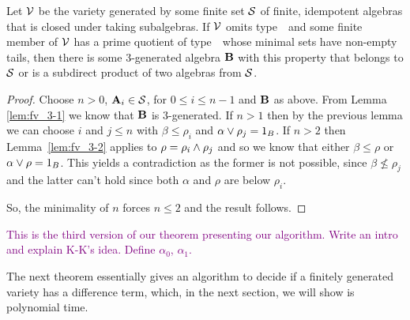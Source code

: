 

\begin{theorem}\label{thm:fv_3-4}
Let $\mathcal{V}$ be the variety generated by some finite set $\mathcal{S}$ of finite,
idempotent algebras that is closed under taking subalgebras. If\/ $\mathcal{V}$
omits type~\utyp\ and some finite member of $\mathcal{V}$ has a prime quotient 
of type~\atyp\
whose minimal sets have non-empty tails, then there is some
3-generated algebra $\mathbf{B}$ with this property that belongs to $\mathcal{S}$ or is a subdirect
product of two algebras from $\mathcal{S}$. 
\end{theorem}
\begin{proof}
Choose $n > 0$, $\mathbf{A}_i \in \mathcal{S}$, for $0 \le i \le n-1$ and $\mathbf{B}$
as above. From Lemma \ref{lem:fv_3-1} we know that $\mathbf{B}$ is
3-generated. If $n > 1$ then by the previous lemma we can choose $i$
and $j \le n$ with $\beta \le \rho_i$ and $\alpha \join \rho_j =
1_B$. If $n > 2$ then Lemma~\ref{lem:fv_3-2} applies to $\rho = \rho_i
\meet \rho_j$ and so we know that either $\beta \le \rho$ or $\alpha
\join \rho = 1_B$. This yields a contradiction as the former is not
possible, since $\beta \not\le \rho_j$ and the latter can't hold
since both $\alpha$ and $\rho$ are below $\rho_i$.

So, the minimality of $n$ forces $n\le 2$ and the result follows.
\end{proof}

\textcolor{purple}{This is the third version of our theorem presenting
our algorithm. Write an intro and explain K-K's idea. Define $\alpha_0$, $\alpha_1$.}

The next theorem essentially gives an algorithm to decide if a finitely
generated variety has a difference term, which, in the next section, we 
will show is polynomial time. 


